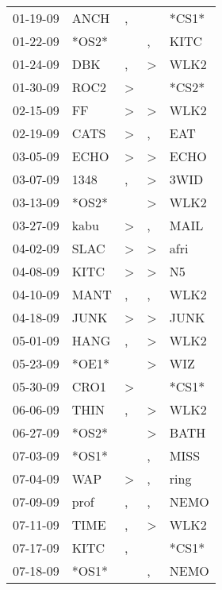 \begin{supertabular}{lllll}
 01-19-09 &   ANCH &             , &               &  *CS1* \\
 01-22-09 &  *OS2* &               &             , &   KITC \\
 01-24-09 &    DBK &             , &  \textgreater &   WLK2 \\
 01-30-09 &   ROC2 &  \textgreater &               &  *CS2* \\
 02-15-09 &     FF &  \textgreater &  \textgreater &   WLK2 \\
 02-19-09 &   CATS &  \textgreater &             , &    EAT \\
 03-05-09 &   ECHO &  \textgreater &  \textgreater &   ECHO \\
 03-07-09 &   1348 &             , &  \textgreater &   3WID \\
 03-13-09 &  *OS2* &               &  \textgreater &   WLK2 \\
 03-27-09 &   kabu &  \textgreater &             , &   MAIL \\
 04-02-09 &   SLAC &  \textgreater &  \textgreater &   afri \\
 04-08-09 &   KITC &  \textgreater &  \textgreater &     N5 \\
 04-10-09 &   MANT &             , &             , &   WLK2 \\
 04-18-09 &   JUNK &  \textgreater &  \textgreater &   JUNK \\
 05-01-09 &   HANG &             , &  \textgreater &   WLK2 \\
 05-23-09 &  *OE1* &               &  \textgreater &    WIZ \\
 05-30-09 &   CRO1 &  \textgreater &               &  *CS1* \\
 06-06-09 &   THIN &             , &  \textgreater &   WLK2 \\
 06-27-09 &  *OS2* &               &  \textgreater &   BATH \\
 07-03-09 &  *OS1* &               &             , &   MISS \\
 07-04-09 &    WAP &  \textgreater &             , &   ring \\
 07-09-09 &   prof &             , &             , &   NEMO \\
 07-11-09 &   TIME &             , &  \textgreater &   WLK2 \\
 07-17-09 &   KITC &             , &               &  *CS1* \\
 07-18-09 &  *OS1* &               &             , &   NEMO \\

\end{supertabular}
